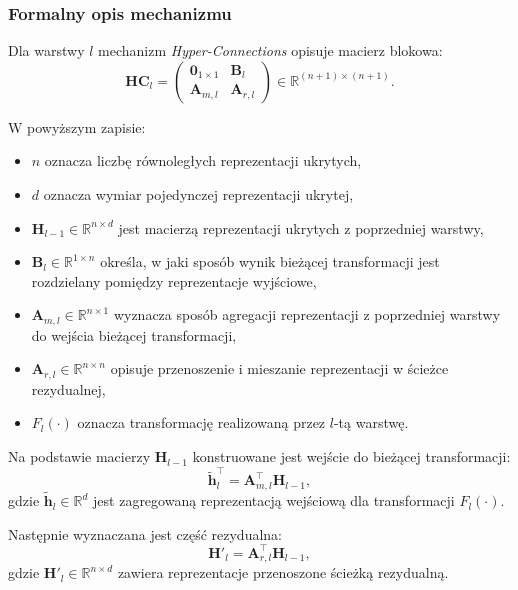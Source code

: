 \subsubsection*{Formalny opis mechanizmu}

Dla warstwy \(l\) mechanizm \textit{Hyper-Connections} opisuje macierz blokowa:
\begin{equation}
	\mathbf{HC}_l =
	\begin{pmatrix}
		\mathbf{0}_{1 \times 1} & \mathbf{B}_l \\
		\mathbf{A}_{m,l} & \mathbf{A}_{r,l}
	\end{pmatrix}
	\in \mathbb{R}^{(n+1)\times(n+1)}.
\end{equation}

W powyższym zapisie:
\begin{itemize}
	\item \(n\) oznacza liczbę równoległych reprezentacji ukrytych,
	\item \(d\) oznacza wymiar pojedynczej reprezentacji ukrytej,
	\item \(\mathbf{H}_{l-1} \in \mathbb{R}^{n \times d}\) jest macierzą reprezentacji ukrytych z poprzedniej warstwy,
	\item \(\mathbf{B}_l \in \mathbb{R}^{1 \times n}\) określa, w jaki sposób wynik bieżącej transformacji jest rozdzielany pomiędzy reprezentacje wyjściowe,
	\item \(\mathbf{A}_{m,l} \in \mathbb{R}^{n \times 1}\) wyznacza sposób agregacji reprezentacji z poprzedniej warstwy do wejścia bieżącej transformacji,
	\item \(\mathbf{A}_{r,l} \in \mathbb{R}^{n \times n}\) opisuje przenoszenie i mieszanie reprezentacji w ścieżce rezydualnej,
	\item \(F_l(\cdot)\) oznacza transformację realizowaną przez \(l\)-tą warstwę.
\end{itemize}

Na podstawie macierzy \(\mathbf{H}_{l-1}\) konstruowane jest wejście do bieżącej transformacji:
\begin{equation}
	\tilde{\mathbf{h}}_l^{\top} = \mathbf{A}_{m,l}^{\top}\mathbf{H}_{l-1},
\end{equation}
gdzie \(\tilde{\mathbf{h}}_l \in \mathbb{R}^{d}\) jest zagregowaną reprezentacją wejściową
dla transformacji \(F_l(\cdot)\).

Następnie wyznaczana jest część rezydualna:
\begin{equation}
	\mathbf{H}'_l = \mathbf{A}_{r,l}^{\top}\mathbf{H}_{l-1},
\end{equation}
gdzie \(\mathbf{H}'_l \in \mathbb{R}^{n \times d}\) zawiera reprezentacje przenoszone
ścieżką rezydualną.

